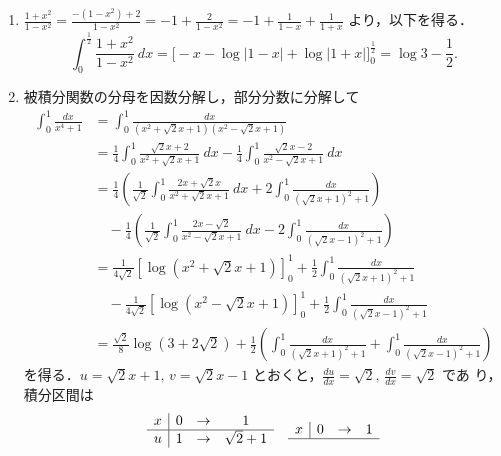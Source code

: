 \documentclass[11pt, uplatex, dvipdfmx]{jsarticle}
\newcommand{\ds}{\displaystyle}
\begin{document}
\begin{enumerate}[(1)]
         

   \item
     $\ds \frac{1+x^2}{1-x^2} = \frac{-(1-x^2)+2}{1-x^2} = -1 +
     \frac{2}{1-x^2} = -1 +\frac{1}{1-x}+\frac{1}{1+x}$ より，以下を得る．
     \[
       \int_{0}^{\frac{1}{2}} \frac{1+x^2}{1-x^2} \ dx 
         = \Big[ -x - \log\left|1-x\right| + \log\left|1+x\right|\Big]_{0}^{\frac{1}{2}}
         = \log 3 - \frac{1}{2}.
     \]

   \item 被積分関数の分母を因数分解し，部分分数に分解して 
     \begin{align*}
       \int_{0}^{1} \frac{dx}{x^4+1} 
       &= \int_{0}^{1}
         \frac{dx}{(x^2+\sqrt{2}x+1)(x^2-\sqrt{2}x+1)}\\
       &= \frac{1}{4} \int_{0}^{1} \frac{\sqrt{2}x+2}{x^2+\sqrt{2}x+1}
         \ dx
         - \frac{1}{4} \int_{0}^{1} \frac{\sqrt{2}x-2}{x^2-\sqrt{2}x+1} \ dx\\
       &= \frac{1}{4} \left( \frac{1}{\sqrt{2}} \int_{0}^{1} \frac{2x+\sqrt{2}x}{x^2+\sqrt{2}x+1} \ dx 
         + 2 \int_{0}^{1} \frac{dx}{ \left(\sqrt{2}x+1 \right)^2+1} \right)\\
       & \quad - \frac{1}{4} \left( \frac{1}{\sqrt{2}} \int_{0}^{1} \frac{2x-\sqrt{2}}{x^2-\sqrt{2}x+1} \ dx
         -2 \int_{0}^{1} \frac{dx}{\left(\sqrt{2}x-1\right)^2+1} \right)\\
       & = \frac{1}{4\sqrt{2}} \left[ \log \left( x^2+\sqrt{2}x+1 \right) \right]_{0}^{1}
         + \frac{1}{2} \int_{0}^{1} \frac{dx}{\left( \sqrt{2}x+1\right)^2+1}\\
       & \quad - \frac{1}{4\sqrt{2}} \left[ \log \left( x^2-\sqrt{2}x+1\right) \right]_{0}^{1}
         +\frac{1}{2} \int_{0}^{1} \frac{dx}{\left(\sqrt{2}x-1\right)^2+1}\\
       &= \frac{\sqrt{2}}{8} \log \left( 3+2\sqrt{2}\right)  
         + \frac{1}{2}\left(\int_{0}^{1} \frac{dx}{\left(\sqrt{2}x+1\right)^2+1}
         + \int_{0}^{1}\frac{dx}{\left( \sqrt{2}x-1\right)^2 +1} \right)
     \end{align*}
     を得る．$u=\sqrt{2}x+1, \, v=\sqrt{2}x-1$
     とおくと，$\frac{du}{dx} = \sqrt{2}, \, \frac{dv}{dx}=\sqrt{2}$ であ
     り，積分区間は
     \[
       \begin{array}{c|rcc}
         x & 0 & \to & 1\\ \hline
         u & 1 & \to & \sqrt{2}+1 
       \end{array} \quad
       \begin{array}{c|ccc}
         x & 0 & \to & 1 \\ \hline

\end{array}\]
\end{enumerate}
\end{document}

